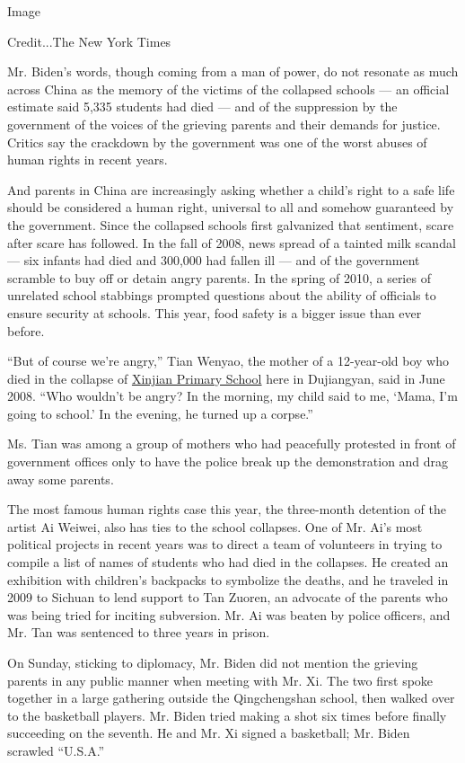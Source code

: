Image

Credit...The New York Times

Mr. Biden's words, though coming from a man of power, do not resonate as
much across China as the memory of the victims of the collapsed schools
--- an official estimate said 5,335 students had died --- and of the
suppression by the government of the voices of the grieving parents and
their demands for justice. Critics say the crackdown by the government
was one of the worst abuses of human rights in recent years.

And parents in China are increasingly asking whether a child's right to
a safe life should be considered a human right, universal to all and
somehow guaranteed by the government. Since the collapsed schools first
galvanized that sentiment, scare after scare has followed. In the fall
of 2008, news spread of a tainted milk scandal --- six infants had died
and 300,000 had fallen ill --- and of the government scramble to buy off
or detain angry parents. In the spring of 2010, a series of unrelated
school stabbings prompted questions about the ability of officials to
ensure security at schools. This year, food safety is a bigger issue
than ever before.

``But of course we're angry,'' Tian Wenyao, the mother of a 12-year-old
boy who died in the collapse of
\href{http://www.nytimes3xbfgragh.onion/2008/05/15/world/asia/15morgue.html}{Xinjian
Primary School} here in Dujiangyan, said in June 2008. ``Who wouldn't be
angry? In the morning, my child said to me, `Mama, I'm going to school.'
In the evening, he turned up a corpse.''

Ms. Tian was among a group of mothers who had peacefully protested in
front of government offices only to have the police break up the
demonstration and drag away some parents.

The most famous human rights case this year, the three-month detention
of the artist Ai Weiwei, also has ties to the school collapses. One of
Mr. Ai's most political projects in recent years was to direct a team of
volunteers in trying to compile a list of names of students who had died
in the collapses. He created an exhibition with children's backpacks to
symbolize the deaths, and he traveled in 2009 to Sichuan to lend support
to Tan Zuoren, an advocate of the parents who was being tried for
inciting subversion. Mr. Ai was beaten by police officers, and Mr. Tan
was sentenced to three years in prison.

On Sunday, sticking to diplomacy, Mr. Biden did not mention the grieving
parents in any public manner when meeting with Mr. Xi. The two first
spoke together in a large gathering outside the Qingchengshan school,
then walked over to the basketball players. Mr. Biden tried making a
shot six times before finally succeeding on the seventh. He and Mr. Xi
signed a basketball; Mr. Biden scrawled ``U.S.A.''

